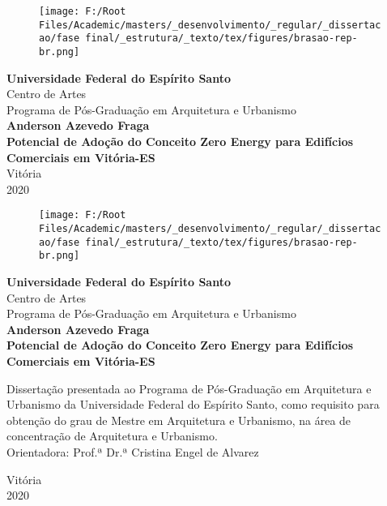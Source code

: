 \begin{titlepage}
    \begin{center}
        \thispagestyle{empty}
        \begin{figure}
            \centering
            \texttt{[image: F:/Root Files/Academic/masters/\_desenvolvimento/\_regular/\_dissertacao/fase final/\_estrutura/\_texto/tex/figures/brasao-rep-br.png]}
        \end{figure}
        \vspace*{0.1cm}
        \textbf{\large Universidade Federal do Espírito Santo}\\
        \large Centro de Artes\\
        \large Programa de Pós-Graduação em Arquitetura e Urbanismo\\
        \vspace*{3cm}
        \textbf{\large Anderson Azevedo Fraga}\\
        \vspace*{4cm}
        \textbf{Potencial de Adoção do Conceito Zero Energy para Edifícios Comerciais em Vitória-ES}\\
        \vfill %
        Vitória\\
        2020\pagebreak

        \begin{figure}
            \thispagestyle{empty} %
            \centering
            \texttt{[image: F:/Root Files/Academic/masters/\_desenvolvimento/\_regular/\_dissertacao/fase final/\_estrutura/\_texto/tex/figures/brasao-rep-br.png]}
        \end{figure}
        \vspace*{0.1cm}
        \textbf{\large Universidade Federal do Espírito Santo}\\
        \large Centro de Artes\\
        \large Programa de Pós-Graduação em Arquitetura e Urbanismo\\
        \vspace*{3cm}
        \textbf{\large Anderson Azevedo Fraga}\\
        \vspace*{4cm}
        \textbf{Potencial de Adoção do Conceito Zero Energy para Edifícios Comerciais em Vitória-ES}\\
        \vspace*{1cm}
            \hfill\begin{minipage}{0.5\linewidth}
            \normalsize Dissertação presentada ao Programa
            de Pós-Graduação em Arquitetura e
            Urbanismo da Universidade Federal do
            Espírito Santo, como requisito para
            obtenção do grau de Mestre em
            Arquitetura e Urbanismo, na área de
            concentração de Arquitetura e
            Urbanismo.\\
            Orientadora: Prof.ª Dr.ª Cristina Engel de
            Alvarez
            \end{minipage}            
        \vfill %
        Vitória\\
        2020\pagebreak


\end{center}
\end{titlepage}
